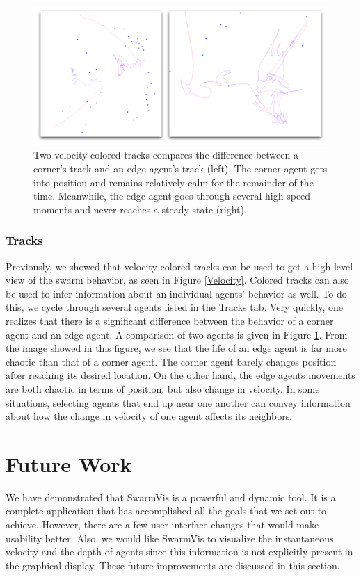 \documentclass[conference]{IEEEtran}
\begin{document}
\begin{figure}
\centering
\includegraphics[scale=.3]{images/cornervsedge.pdf}
\caption{
Two velocity colored tracks compares the difference between a corner's track and an edge agent's track (left).
The corner agent gets into position and remains relatively calm for the remainder of the time.
Meanwhile, the edge agent goes through several high-speed moments and never reaches a steady state (right).
}
\label{CornerAndEdge}
\end{figure}

\subsubsection{Tracks}
Previously, we showed that velocity colored tracks can be used to get a high-level view of the swarm behavior,
as seen in Figure \ref{Velocity}.
Colored tracks can also be used to infer information about an individual agents' behavior as well.
To do this, we cycle through several agents listed in the Tracks tab.
Very quickly, one realizes that there is a significant difference between the behavior of a corner agent and an edge agent.
A comparison of two agents is given in Figure \ref{CornerAndEdge}.
From the image showed in this figure, we see that the life of an edge agent is far more chaotic than that of a corner agent.
The corner agent barely changes position after reaching its desired location.
On the other hand, the edge agents movements are both chaotic in terms of position, but also change in velocity.
In some situations, selecting agents that end up near one another can convey information about how the change 
in velocity of one agent affects its neighbors.







\section{Future Work}
We have demonstrated that SwarmVis is a powerful and dynamic tool.
It is a complete application that has accomplished all the goals that we set out to achieve. 
However, there are a few user interface changes that would make usability better.
Also, we would like SwarmVis to visualize the instantaneous velocity and the depth of
agents since this information is not explicitly present in the
graphical display. These future improvements are discussed in this section.
\end{document}

